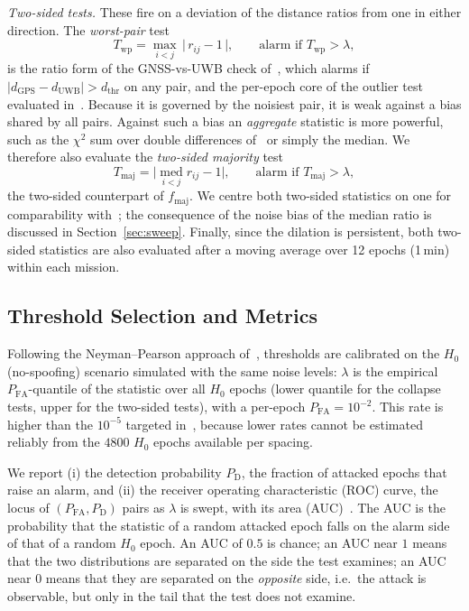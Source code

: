 \documentclass[conference]{IEEEtran}
\newcommand{\PD}{P_{\mathrm{D}}}
\newcommand{\PFA}{P_{\mathrm{FA}}}
\begin{document}
\emph{Two-sided tests.}
These fire on a deviation of the distance ratios from one in either
direction. The \emph{worst-pair} test
\begin{equation}
T_{\mathrm{wp}} = \max_{i<j}\,\bigl|\,r_{ij}-1\,\bigr|,
\qquad \text{alarm if } T_{\mathrm{wp}}>\lambda ,
\label{eq:cons}
\end{equation}
is the ratio form of the GNSS-vs-UWB check of~\cite{mykytyn2023uwb},
which alarms if $|d_{\mathrm{GPS}}-d_{\mathrm{UWB}}|>d_{\mathrm{thr}}$
on any pair, and the per-epoch core of the outlier test evaluated
in~\cite{tibaldo2025gnsswasp}. Because it is governed by the noisiest
pair, it is weak against a bias shared by all pairs. Against such a
bias an \emph{aggregate} statistic is more powerful, such as the
$\chi^2$ sum over double differences of~\cite{stenberg2022multiple} or
simply the median. We therefore also evaluate the \emph{two-sided
majority} test
\begin{equation}
T_{\mathrm{maj}} = \bigl|\operatorname*{med}_{i<j} r_{ij}-1\bigr|,
\qquad \text{alarm if } T_{\mathrm{maj}}>\lambda ,
\label{eq:maj2}
\end{equation}
the two-sided counterpart of $f_{\mathrm{maj}}$. We centre both
two-sided statistics on one for comparability with~\cite{mykytyn2023uwb};
the consequence of the noise bias of the median ratio is discussed in
Section~\ref{sec:sweep}. Finally, since the dilation is persistent, both
two-sided statistics are also evaluated after a moving average over 12
epochs (1\,min) within each mission.

\subsection{Threshold Selection and Metrics}
\label{sec:metrics}
Following the Neyman--Pearson approach
of~\cite{jansen2016multireceiver,kay1998detection}, thresholds are
calibrated on the $H_0$ (no-spoofing) scenario simulated with the same
noise levels: $\lambda$ is the empirical $\PFA$-quantile of the
statistic over all $H_0$ epochs (lower quantile for the collapse tests,
upper for the two-sided tests), with a per-epoch $\PFA=10^{-2}$. This
rate is higher than the $10^{-5}$ targeted
in~\cite{jansen2016multireceiver}, because lower rates cannot be
estimated reliably from the $4800$ $H_0$ epochs available per spacing.

We report (i) the detection probability $\PD$, the fraction of attacked
epochs that raise an alarm, and (ii) the receiver operating
characteristic (ROC) curve, the locus of $(\PFA,\PD)$ pairs as
$\lambda$ is swept, with its area (AUC)~\cite{kay1998detection}. The
AUC is the probability that the statistic of a random attacked epoch
falls on the alarm side of that of a random $H_0$ epoch. An AUC of $0.5$
is chance; an AUC near $1$ means that the two distributions are
separated on the side the test examines; an AUC near $0$ means that
they are separated on the \emph{opposite} side, i.e.\ the attack is
observable, but only in the tail that the test does not examine.
\end{document}
